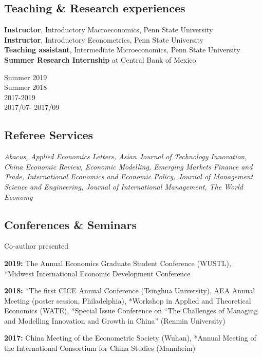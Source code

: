 \documentclass[letterpaper]{article}
\begin{document}
\subsection*{Teaching \& Research experiences}
\begin{minipage}{0.8\textwidth}
  \textbf{Instructor}, Introductory Macroeconomics, Penn State University \\
  \textbf{Instructor}, Introductory Econometrics, Penn State University \\
  \textbf{Teaching assistant}, Intermediate Microeconomics, Penn State University \\
  \textbf{Summer Research Internship} at Central Bank of Mexico
\end{minipage}
\begin{minipage}{0.2\textwidth}
    Summer 2019 \\
    Summer 2018 \\
   2017-2019  \\
  2017/07- 2017/09
\end{minipage}

  \subsection*{Referee Services}
      {\it Abacus, Applied Economics Letters, Asian Journal of Technology Innovation, China Economic Review, Economic Modelling, Emerging Markets Finance and Trade, International Economics and Economic Policy, Journal of Management Science and Engineering, Journal of International Management, The World Economy }

\subsection*{Conferences \& Seminars}
{\footnotesize * Co-author presented}
\vspace{1em}

\textbf{2019:} The  Annual Economics Graduate Student Conference (WUSTL), *Midwest International Economic Development Conference

\textbf{2018:} *The first CICE Annual Conference (Tsinghua University), AEA Annual Meeting (poster session, Philadelphia), *Workshop in Applied and Theoretical Economics (WATE), *Special Issue Conference on “The Challenges of Managing and Modelling Innovation and Growth in China” (Renmin University)

\textbf{2017:} China Meeting of the Econometric Society (Wuhan), *Annual Meeting of the International Consortium for China Studies (Mannheim)
\end{document}
